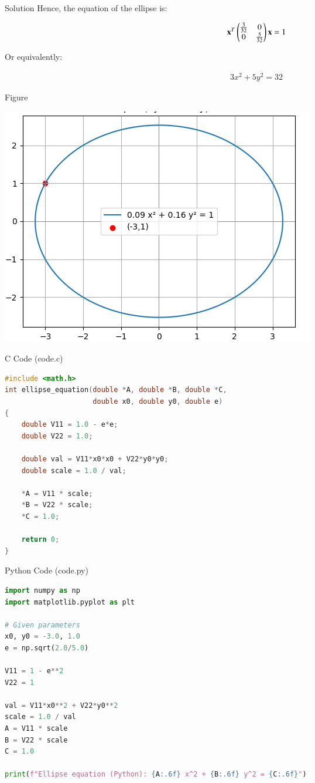 \documentclass{beamer}
\begin{document}
\begin{frame}{Solution}
Hence, the equation of the ellipse is:

\begin{align}
\mathbf{x}^T \begin{pmatrix}\frac{3}{32} & 0 \\ 0 & \frac{5}{32}\end{pmatrix} \mathbf{x} = 1
\end{align}

Or equivalently:

\begin{align}
3 x^2 + 5 y^2 = 32
\end{align}
\end{frame}

\begin{frame}{Figure}
\begin{center}
\includegraphics[width=0.6\columnwidth]{figs/fig.png}
\end{center}
\end{frame}
\begin{frame}[fragile]{C Code (code.c)}
\begin{lstlisting}[language=C]
#include <math.h>
int ellipse_equation(double *A, double *B, double *C,
                     double x0, double y0, double e)
{
    double V11 = 1.0 - e*e;
    double V22 = 1.0;

    double val = V11*x0*x0 + V22*y0*y0;
    double scale = 1.0 / val;

    *A = V11 * scale;
    *B = V22 * scale;
    *C = 1.0;

    return 0;
}
\end{lstlisting}
\end{frame}
\begin{frame}[fragile]{Python Code (code.py)}
\begin{lstlisting}[language=Python]
import numpy as np
import matplotlib.pyplot as plt

# Given parameters
x0, y0 = -3.0, 1.0
e = np.sqrt(2.0/5.0)

V11 = 1 - e**2
V22 = 1

val = V11*x0**2 + V22*y0**2
scale = 1.0 / val
A = V11 * scale
B = V22 * scale
C = 1.0

print(f"Ellipse equation (Python): {A:.6f} x^2 + {B:.6f} y^2 = {C:.6f}")
\end{lstlisting}
\end{frame}
\end{document}
